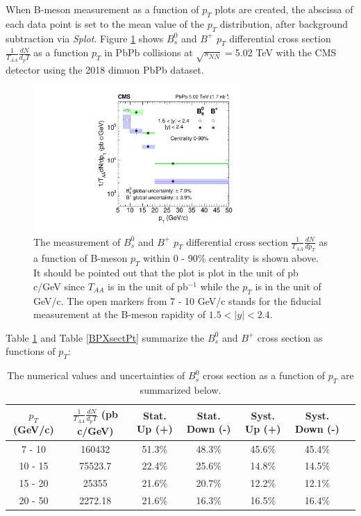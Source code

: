 When B-meson measurement as a function of $p_T$ plots are created, the abscissa of each data point is set to the mean value of the $p_T$ distribution, after background subtraction via \textit{Splot}. Figure \ref{BmesonDataPt} shows $B^0_s$ and $B^+$ $p_T$ differential cross section $\frac{1}{T_{AA}} \frac{dN}{d_pT}$ as a function $p_T$ in PbPb collisions at $\sqrt{s_{NN}} = $5.02 TeV with the CMS detector using the 2018 dimuon PbPb dataset.

\begin{figure}[hbtp]
\begin{center}
\includegraphics[width=0.70\textwidth]{Figures/Chapter5/xsec_vsPt.pdf}
\caption{The measurement of $B^0_s$ and $B^+$ $p_T$ differential cross section $\frac{1}{T_{AA}} \frac{dN}{d p_T}$ as a function of B-meson $p_T$ within 0 - 90\% centrality is shown above. It should be pointed out that the plot is plot in the unit of pb c/GeV since $T_{AA}$ is in the unit of pb$^{-1}$ while the $p_T$ is in the unit of GeV/c. The open markers from 7 - 10 GeV/c stands for the fiducial measurement at the B-meson rapidity of $1.5 < |y| < 2.4$.}
\label{BmesonDataPt}
\end{center}
\end{figure}

Table \ref{BsXsectPt} and Table \ref{BPXsectPt} summarize the $B^0_s$ and $B^+$ cross section as functions of $p_T$:

\begin{table}[h]
\begin{center}
\caption{The numerical values and uncertainties of $B^0_s$ cross section as a function of $p_T$ are summarized below.}
\vspace{1em}
\label{BsXsectPt}
  \begin{tabular}{| c | c |c | c| c| c| c|}
    \hline
$p_T$ (GeV/c) &  $\frac{1}{T_{AA}} \frac{dN}{d_pT}$ (pb c/GeV) & Stat. Up (+)   & Stat. Down (-)  &  Syst. Up (+)  &  Syst. Down (-) \\
    \hline
    \hline
 7 - 10 &   160432  &  51.3\% & 48.3\% & 45.6\% & 45.4\% \\ 
 10 - 15 & 75523.7  & 22.4\%  & 25.6\%  & 14.8\% & 14.5\% \\ 
 15 - 20 &  25355 & 21.6\%   &  20.7\% & 12.2\% & 12.1\% \\ 
 20 - 50 &  2272.18    & 21.6\%  &  16.3\% & 16.5\% &16.4\% \\ 
    \hline
    \hline
\end{tabular}
\end{center}
\end{table}


